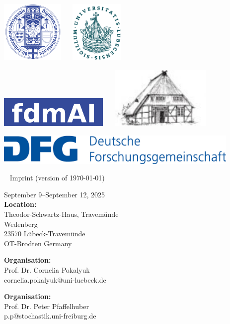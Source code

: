 \documentclass[12pt,a4paper]{article}
\makeatletter
\newcommand{\Impressum}{%
{\scriptsize
\fboxsep0pt
{\begin{minipage}[b]{.4\textwidth}
September 9--September 12, 2025\\[.5ex]
\textbf{Location: }\\
Theodor-Schwartz-Haus, Travemünde\\
Wedenberg \\
23570 Lübeck-Travemünde \\ OT-Brodten
Germany
\end{minipage}}
\hfill
{\begin{minipage}[b]{.29\textwidth}
\textbf{Organisation: }\\
Prof. Dr. Cornelia Pokalyuk \\
cornelia.pokalyuk@uni-luebeck.de  
\end{minipage}}%
\hfill
{\begin{minipage}[b]{.29\textwidth}
\textbf{Organisation: }\\
Prof. Dr. Peter Pfaffelhuber\\
p.p@stochastik.uni-freiburg.de
\end{minipage}} 
}}
\makeatother
\begin{document}
\includegraphics[height=3cm]{UFR-vorlage-designsystem-typo-farben-V1.99-768x543.png}
~\hfill ~
\includegraphics[height=3cm]{Siegel-Uni-Luebeck.svg.png}
~\hfill ~

\bigskip
\includegraphics[height=1.5cm]{fdmai.png}
~\hfill ~
\includegraphics[height=3cm]{logo-tsh.jpg}
~\hfill ~

\bigskip
\bigskip
\bigskip
\bigskip

\includegraphics[height=1.5cm]{dfg.jpg}

 ~
 \vfill
 {\scriptsize Imprint {\tiny (version of \today) }} \\[1ex]
 \Impressum
 
 \bigskip
\end{document}
